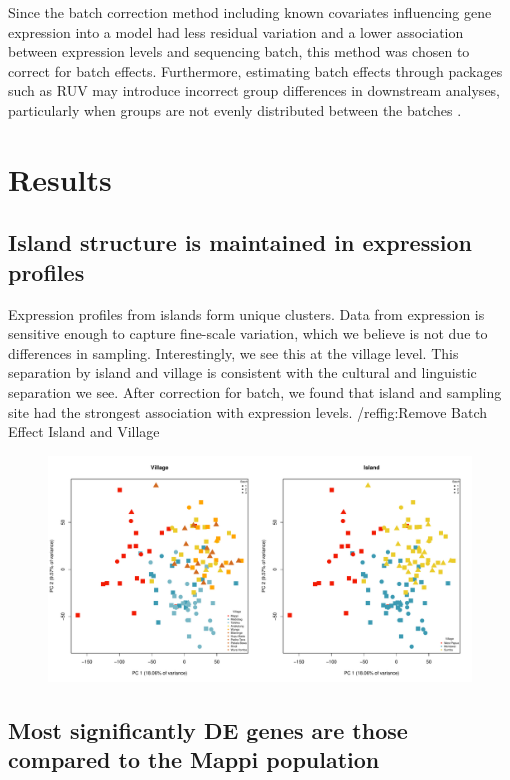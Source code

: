 \documentclass[12pt,a4paper,titlepage,twoside,openright]{book}
\begin{document}
\begin{mainmatter}
{{Since the batch correction method including known covariates influencing gene expression into a model had less residual variation and a lower association between expression levels and sequencing batch, this method was chosen to correct for batch effects. Furthermore, estimating batch effects through packages such as RUV may introduce incorrect group differences in downstream analyses, particularly when groups are not evenly distributed between the batches \cite{nygaard2016methods}.

\chapter{Results}\label{}

\section{Island structure is maintained in expression profiles}

Expression profiles from islands form unique clusters. Data from expression is sensitive enough to capture fine-scale variation, which we believe is not due to differences in sampling. Interestingly, we see this at the village level. This separation by island and village is consistent with the cultural and linguistic separation we see. After correction for batch, we found that island and sampling site had the strongest association with expression levels. /ref{fig:Remove Batch Effect Island and Village}

\begin{figure}[htb!]
\centering
\includegraphics[width=\textwidth,height=\textheight,keepaspectratio]{Figures/samplingsiteAndVillagePCA.pdf}
\caption{}
\label{fig:Remove Batch Effect Island and Village}
\end{figure}


\section{Most significantly DE genes are those compared to the Mappi population}

}}
\end{mainmatter}
\end{document}
